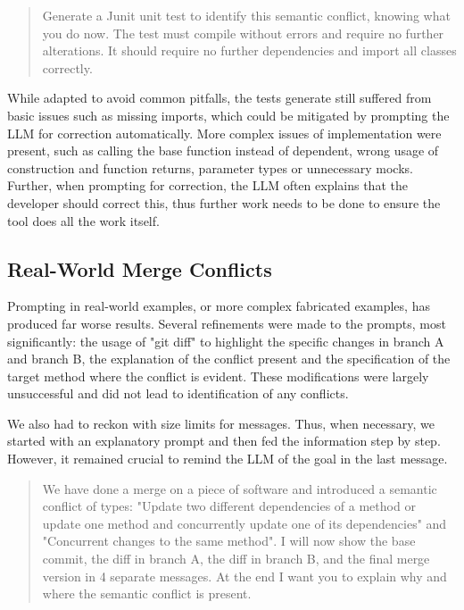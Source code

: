 \begin{quote}
Generate a Junit unit test to identify this semantic conflict, knowing what you do now. The test must compile without errors and require no further alterations. It should require no further dependencies and import all classes correctly.
\end{quote}

While adapted to avoid common pitfalls, the tests generate still suffered from basic issues such as missing imports, which could be mitigated by prompting the LLM for correction automatically. More complex issues of implementation were present, such as calling the base function instead of dependent, wrong usage of construction and function returns, parameter types or unnecessary mocks. Further, when prompting for correction, the LLM often explains that the developer should correct this, thus further work needs to be done to ensure the tool does all the work itself.

\subsection{Real-World Merge Conflicts}

Prompting in real-world examples, or more complex fabricated examples, has produced far worse results. Several refinements were made to the prompts, most significantly: the usage of "git diff" to highlight the specific changes in branch A and branch B, the explanation of the conflict present and the specification of the target method where the conflict is evident. These modifications were largely unsuccessful and did not lead to identification of any conflicts.

We also had to reckon with size limits for messages. Thus, when necessary, we started with an explanatory prompt and then fed the information step by step. However, it remained crucial to remind the LLM of the goal in the last message.

\begin{quote}
We have done a merge on a piece of software and introduced a semantic conflict of types: "Update two different dependencies of a method or update one method and concurrently update one of its dependencies" and "Concurrent changes to the same method". I will now show the base commit, the diff in branch A, the diff in branch B, and the final merge version in 4 separate messages. At the end I want you to explain why and where the semantic conflict is present.
\end{quote}

